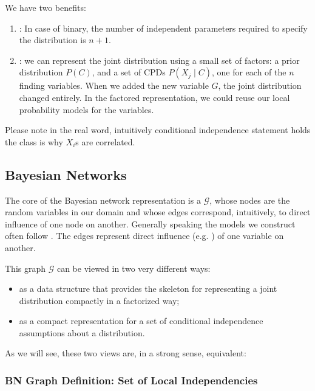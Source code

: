 \documentclass{article}
\begin{document}
We have two benefits:
\begin{enumerate}
    \item {}: In case of binary, the number of independent parameters required to specify the distribution is $n+1$.
    \item {}: we can represent the joint distribution using a small set of factors: a prior distribution $P(C)$, and a set of CPDs $P\left(X_{j} \mid C\right)$, one for each of the $n$ finding variables. When we added the new variable $G$, the joint distribution changed entirely. In the factored representation, we could reuse our local probability models for the variables.
\end{enumerate}
Please note in the real word, intuitively conditional independence statement holds  the class is  why $X_i$s are correlated.


\subsection{Bayesian Networks}
The core of the Bayesian network representation is a  $\mathcal{G}$, whose nodes are the random variables in our domain and whose edges correspond, intuitively, to direct influence of one node on another. Generally speaking the models we construct often follow . The edges represent  direct influence (e.g. ) of one variable on another.

This graph $\mathcal{G}$ can be viewed in two very different ways:
\begin{itemize}
    \item  as a data structure that provides the skeleton for representing a joint distribution compactly in a factorized way;
\item  as a compact representation for a set of conditional independence assumptions about a distribution.
\end{itemize}
As we will see, these two views are, in a strong sense, equivalent:

\centerline{}




\subsubsection{BN Graph Definition: Set of Local Independencies}\label{sec:bay}
\end{document}

